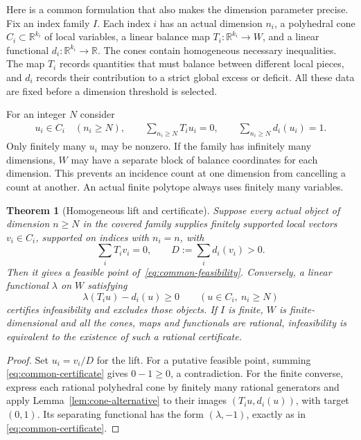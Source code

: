 \documentclass[11pt]{article}
\newtheorem{theorem}{Theorem}[section]
\theoremstyle{definition}
\theoremstyle{remark}
\numberwithin{equation}{section}
\newcommand{\R}{\mathbb R}
\begin{document}
Here is a common formulation that also makes the dimension parameter
precise. Fix an index family $I$. Each index $i$ has an actual dimension
$n_i$, a polyhedral cone $C_i\subset\R^{k_i}$ of local variables,
a linear balance map $T_i:\R^{k_i}\longrightarrow W$, and a linear
functional $d_i:\R^{k_i}\longrightarrow\R$. The cones
contain homogeneous necessary inequalities. The map $T_i$ records
quantities that must balance between different local pieces, and
$d_i$ records their contribution to a strict global excess or deficit.
All these data are fixed before a dimension threshold is selected.

For an integer $N$ consider
\begin{equation}\label{eq:common-feasibility}
 \begin{gathered}
 u_i\in C_i\quad(n_i\ge N),\qquad
 \sum_{n_i\ge N}T_i u_i=0,\qquad
 \sum_{n_i\ge N}d_i(u_i)=1.
 \end{gathered}
\end{equation}
Only finitely many $u_i$ may be nonzero. If the family has infinitely
many dimensions, $W$ may have a separate block of balance coordinates
for each dimension. This prevents an incidence count at one dimension
from cancelling a count at another. An actual finite polytope always
uses finitely many variables.

\begin{theorem}[Homogeneous lift and certificate]
\label{thm:homogeneous-certificate}
Suppose every actual object of dimension $n\ge N$ in the covered
family supplies finitely supported local vectors $v_i\in C_i$,
supported on indices with $n_i=n$, with
\[
             \sum_iT_iv_i=0,\qquad D:=\sum_id_i(v_i)>0.
\]
Then it gives a feasible point of~\eqref{eq:common-feasibility}.
Conversely, a linear functional $\lambda$ on $W$ satisfying
\begin{equation}\label{eq:common-certificate}
       \lambda(T_iu)-d_i(u)\ge0
       \qquad(u\in C_i,\ n_i\ge N)
\end{equation}
certifies infeasibility and excludes those objects.
If $I$ is finite, $W$ is finite-dimensional and all the cones, maps
and functionals are rational, infeasibility is equivalent to the
existence of such a rational certificate.
\end{theorem}
\begin{proof}
Set $u_i=v_i/D$ for the lift. For a putative feasible point, summing
\eqref{eq:common-certificate} gives $0-1\ge0$, a contradiction.
For the finite converse, express each rational polyhedral cone by
finitely many rational generators and apply
Lemma~\ref{lem:cone-alternative} to their images
$(T_iu,d_i(u))$, with target $(0,1)$. Its separating functional has
the form $(\lambda,-1)$, exactly as in
\eqref{eq:common-certificate}.
\end{proof}
\end{document}
